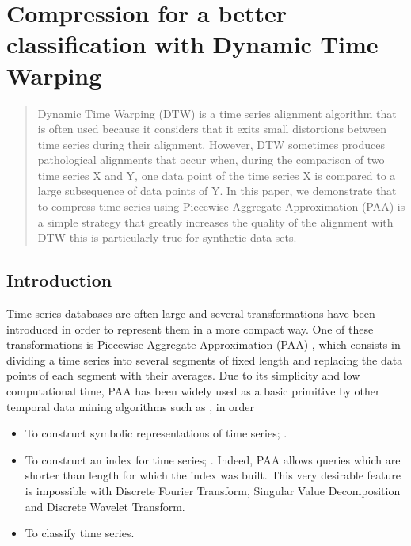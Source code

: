 \chapter[Preprocessing of time series]{Compression for a better classification with Dynamic Time Warping}

\begin{abstract}
 Dynamic Time Warping (DTW) is a time series alignment algorithm that is often used because it
 considers that it exits small distortions between time series during their alignment.  However, DTW
 sometimes produces pathological alignments that occur when, during the comparison of two time series
 X and Y, one data point of the time series X is compared to a large subsequence of data points of Y.
 In this paper, we demonstrate that to compress time series using Piecewise Aggregate Approximation
 (PAA) is a simple strategy that greatly increases the quality of the alignment with DTW this is
 particularly true for synthetic data sets.      
 \end{abstract}

\section{Introduction}
%


Time series databases are often large and several transformations have been
introduced in order to represent them in a more compact way. One of these transformations is
Piecewise Aggregate Approximation (PAA) \cite{keogh2001dimensionality}, which consists in dividing a
time series into several segments of fixed length and replacing the data points of each segment with
their averages. Due to its simplicity and low computational time, PAA has been widely used as a
basic primitive by other temporal data mining algorithms such as \cite{lin2003symbolic,
sun2014improvement, lkhagva2006extended}, in order  
\begin{itemize}
  \item To construct symbolic representations of time
series; \cite{camerra2010isax, ulanova2015scalable}.
  \item To construct an index for time series; \cite{zhao2016shapedtw,
keogh2000scaling, Kate2016}. Indeed, PAA allows queries which are shorter than length for which the
index was built. This very desirable feature is impossible with Discrete Fourier Transform, Singular
Value Decomposition and Discrete Wavelet Transform.
\item To classify time series.
\end{itemize}


